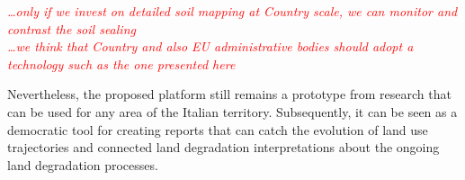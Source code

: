 \documentclass[APA,LATO1COL,doublespace]{WileyNJD-v2}
\newcommand{\toberevised}[1]{\emph{\textcolor{red}{#1}}} %
\newcommand{\reviewer}[1]{\emph{\textcolor{cyan}{#1}}}   %
\begin{document}
\toberevised{
\ldots only if we invest on detailed soil mapping at Country scale, we can monitor and contrast the soil sealing\\
\ldots we think that Country and also EU administrative bodies should adopt a technology such as the one presented here\\
}

Nevertheless, the proposed platform still remains a prototype from research that can be used for any area of the Italian territory. 
Subsequently, it can be seen as a democratic tool for creating reports that can catch the evolution of land use trajectories and connected land degradation interpretations about the ongoing land degradation processes.

\end{document}
